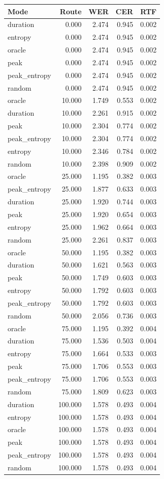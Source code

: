 \begin{tabular}{lrrrr}
\toprule
Mode & Route & WER & CER & RTF \\
\midrule
duration & 0.000 & 2.474 & 0.945 & 0.002 \\
entropy & 0.000 & 2.474 & 0.945 & 0.002 \\
oracle & 0.000 & 2.474 & 0.945 & 0.002 \\
peak & 0.000 & 2.474 & 0.945 & 0.002 \\
peak_entropy & 0.000 & 2.474 & 0.945 & 0.002 \\
random & 0.000 & 2.474 & 0.945 & 0.002 \\
oracle & 10.000 & 1.749 & 0.553 & 0.002 \\
duration & 10.000 & 2.261 & 0.915 & 0.002 \\
peak & 10.000 & 2.304 & 0.774 & 0.002 \\
peak_entropy & 10.000 & 2.304 & 0.774 & 0.002 \\
entropy & 10.000 & 2.346 & 0.784 & 0.002 \\
random & 10.000 & 2.398 & 0.909 & 0.002 \\
oracle & 25.000 & 1.195 & 0.382 & 0.003 \\
peak_entropy & 25.000 & 1.877 & 0.633 & 0.003 \\
duration & 25.000 & 1.920 & 0.744 & 0.003 \\
peak & 25.000 & 1.920 & 0.654 & 0.003 \\
entropy & 25.000 & 1.962 & 0.664 & 0.003 \\
random & 25.000 & 2.261 & 0.837 & 0.003 \\
oracle & 50.000 & 1.195 & 0.382 & 0.003 \\
duration & 50.000 & 1.621 & 0.563 & 0.003 \\
peak & 50.000 & 1.749 & 0.603 & 0.003 \\
entropy & 50.000 & 1.792 & 0.603 & 0.003 \\
peak_entropy & 50.000 & 1.792 & 0.603 & 0.003 \\
random & 50.000 & 2.056 & 0.736 & 0.003 \\
oracle & 75.000 & 1.195 & 0.392 & 0.004 \\
duration & 75.000 & 1.536 & 0.503 & 0.004 \\
entropy & 75.000 & 1.664 & 0.533 & 0.003 \\
peak & 75.000 & 1.706 & 0.553 & 0.003 \\
peak_entropy & 75.000 & 1.706 & 0.553 & 0.003 \\
random & 75.000 & 1.809 & 0.623 & 0.003 \\
duration & 100.000 & 1.578 & 0.493 & 0.004 \\
entropy & 100.000 & 1.578 & 0.493 & 0.004 \\
oracle & 100.000 & 1.578 & 0.493 & 0.004 \\
peak & 100.000 & 1.578 & 0.493 & 0.004 \\
peak_entropy & 100.000 & 1.578 & 0.493 & 0.004 \\
random & 100.000 & 1.578 & 0.493 & 0.004 \\
\bottomrule
\end{tabular}
